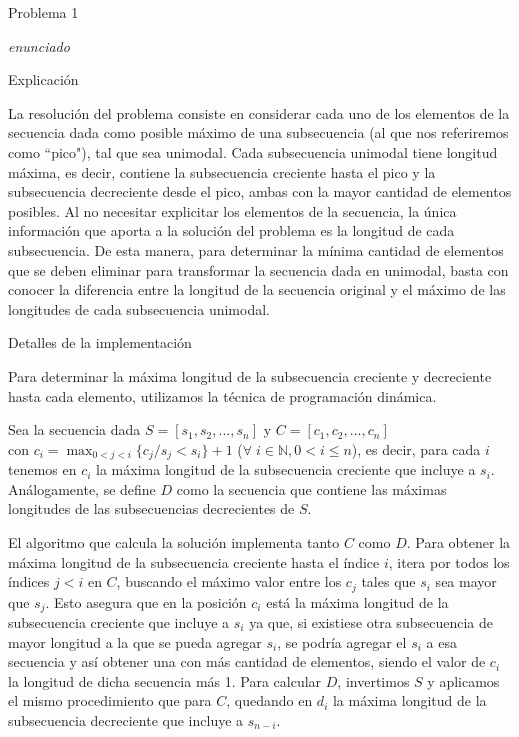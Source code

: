 \begin{section}{Problema 1}

	\textit{enunciado}

	\begin{subsection}{Explicación}

		La resolución del problema consiste en considerar cada uno de los elementos de la secuencia dada como
		posible máximo de una subsecuencia (al que nos referiremos como ``pico"), tal que sea unimodal. Cada 
		subsecuencia unimodal tiene longitud máxima, es decir, contiene la subsecuencia creciente hasta el pico
		y la subsecuencia decreciente desde el pico, ambas con la mayor cantidad de elementos posibles. Al no
		necesitar explicitar los elementos de la secuencia, la única información que aporta a la solución del
		problema es la longitud de cada subsecuencia. De esta manera, para determinar la mínima cantidad de
		elementos que se deben eliminar para transformar la secuencia dada en unimodal, basta con conocer
		la diferencia entre la longitud de la secuencia original y el máximo de las longitudes de cada
		subsecuencia unimodal. 		

	\end{subsection}


	\begin{subsection}{Detalles de la implementación}
		
		Para determinar la máxima longitud de la subsecuencia creciente y decreciente hasta cada elemento,
		utilizamos la técnica de programación dinámica.
		
		Sea la secuencia dada $S=[s_1,s_2,...,s_n]$ y $C=[c_1,c_2,...,c_n]$ \\
		con $c_i=\displaystyle\max_{0<j<i}\{ c_j / s_j < s_i \}+1$ ($\forall\;i\in\mathbb{N}, 0<i\leq n$), es 
		decir, para cada $i$ tenemos en $c_i$ la máxima longitud de la subsecuencia creciente que incluye a
		$s_i$. Análogamente, se define $D$ como la secuencia que contiene las máximas longitudes de las
		subsecuencias decrecientes de $S$.
		
		El algoritmo que calcula la solución implementa tanto $C$ como $D$.	
		Para obtener la máxima longitud de la subsecuencia creciente hasta el índice $i$, itera
		por todos los índices $j<i$ en $C$, buscando el máximo valor entre los $c_j$ tales que $s_i$ sea mayor
		que	$s_j$. 
		Esto asegura que en la posición $c_i$ está la máxima longitud de la subsecuencia creciente
		que incluye a $s_i$ ya que, si existiese otra subsecuencia de mayor longitud a la que se pueda 
		agregar $s_i$, se podría agregar el $s_i$ a esa secuencia y así obtener una con más cantidad de 
		elementos, siendo el valor de $c_i$ la longitud de dicha secuencia más 1. Para calcular $D$,
		invertimos $S$ y aplicamos el mismo	procedimiento que para $C$, quedando en $d_i$ la máxima longitud
		de la subsecuencia decreciente que incluye a $s_{n-i}$.


\end{subsection}
\end{section}
